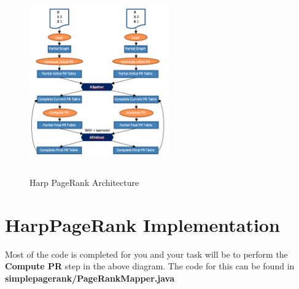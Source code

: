 \documentclass{article}
\begin{document}
\begin{figure}[!htbp]
\includegraphics[width=6cm,height=8cm]{p8}
\centering
\caption{Harp PageRank Architecture}
\end{figure}

\section*{HarpPageRank Implementation}
Most of the code is completed for you and your task will be to perform the \textbf{Compute PR} step in the above diagram. The code for this can be found in \textbf{simplepagerank/PageRankMapper.java}


\end{document}
